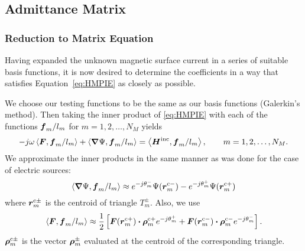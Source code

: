 \subsection{Admittance Matrix}
\subsubsection{Reduction to Matrix Equation}
Having expanded the unknown magnetic surface 
current in a series of suitable basis functions, 
it is now desired to determine the coefficients in a way that satisfies 
Equation~\eqref{eq:HMPIE} as closely as possible.  

We choose our testing functions to be the same as our basis functions 
(Galerkin's method).  Then taking the inner product of \eqref{eq:HMPIE}
with each of the functions $\boldsymbol{f}_m/l_m$  for $m = 1,2,\ldots, N_M$ yields
\begin{equation}
  -j\omega \left< \boldsymbol{F},\boldsymbol{f}_m/l_m \right> + \left< \boldsymbol{\nabla}\Psi,\boldsymbol{f}_m/l_m \right>
  = \left< \boldsymbol{H}^{\text{inc}}, \boldsymbol{f}_m/l_m \right>, \qquad
  m = 1, 2, \ldots,  N_M.   \label{eq:Hmom}
\end{equation}  
We approximate the inner products in the same manner as was done for
the case of electric sources:
\begin{equation}
  \left< \boldsymbol{\nabla}\Psi, \boldsymbol{f}_m/l_m \right> \approx 
         e^{-j\theta_m^-} \Psi(\boldsymbol{r}^{\text{c}-}_m) - e^{-j\theta_m^+} \Psi(\boldsymbol{r}^{\text{c}+}_m)  
         \label{eq:Psimom}
\end{equation}
where $\boldsymbol{r}^{\text{c}\pm}_m$ is the centroid of triangle $T_m^{\pm}$. Also, we use
\begin{equation}
  \left< \boldsymbol{F}, \boldsymbol{f}_m/l_m \right> \approx \frac{1}{2} 
      \left[ \boldsymbol{F}(\boldsymbol{r}^{\text{c}+}_m) \boldsymbol{\cdot} \boldsymbol{\rho}^{\text{c}+}_m e^{-j\theta_m^+} +  
             \boldsymbol{F}(\boldsymbol{r}^{\text{c}-}_m) \boldsymbol{\cdot} \boldsymbol{\rho}^{\text{c}-}_m  e^{-j\theta_m^-}
      \right].      \label{eq:Fmom}
\end{equation}  
$\boldsymbol{\rho}^{\text{c}\pm}_m$ is the vector $\boldsymbol{\rho}_m^{\pm}$ evaluated at the centroid
of the corresponding triangle.


